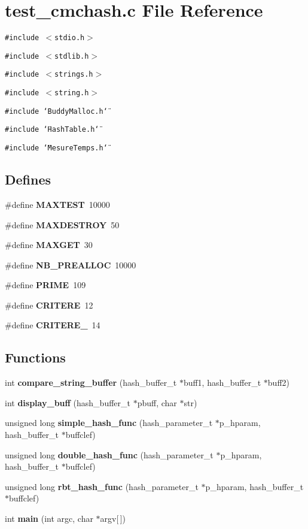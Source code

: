 \section{test\_\-cmchash.c File Reference}
\label{test__cmchash_8c}
{\tt \#include $<$stdio.h$>$}\par
{\tt \#include $<$stdlib.h$>$}\par
{\tt \#include $<$strings.h$>$}\par
{\tt \#include $<$string.h$>$}\par
{\tt \#include \char`\"{}BuddyMalloc.h\char`\"{}}\par
{\tt \#include \char`\"{}HashTable.h\char`\"{}}\par
{\tt \#include \char`\"{}MesureTemps.h\char`\"{}}\par
\subsection*{Defines}
\begin{CompactItemize}
\item 
\#define {\bf MAXTEST}~10000
\item 
\#define {\bf MAXDESTROY}~50
\item 
\#define {\bf MAXGET}~30
\item 
\#define {\bf NB\_\-PREALLOC}~10000
\item 
\#define {\bf PRIME}~109
\item 
\#define {\bf CRITERE}~12
\item 
\#define {\bf CRITERE\_}~14
\end{CompactItemize}
\subsection*{Functions}
\begin{CompactItemize}
\item 
int {\bf compare\_\-string\_\-buffer} (hash\_\-buffer\_\-t $\ast$buff1, hash\_\-buffer\_\-t $\ast$buff2)
\item 
int {\bf display\_\-buff} (hash\_\-buffer\_\-t $\ast$pbuff, char $\ast$str)
\item 
unsigned long {\bf simple\_\-hash\_\-func} (hash\_\-parameter\_\-t $\ast$p\_\-hparam, hash\_\-buffer\_\-t $\ast$buffclef)
\item 
unsigned long {\bf double\_\-hash\_\-func} (hash\_\-parameter\_\-t $\ast$p\_\-hparam, hash\_\-buffer\_\-t $\ast$buffclef)
\item 
unsigned long {\bf rbt\_\-hash\_\-func} (hash\_\-parameter\_\-t $\ast$p\_\-hparam, hash\_\-buffer\_\-t $\ast$buffclef)
\item 
int {\bf main} (int argc, char $\ast$argv[$\,$])
\end{CompactItemize}


